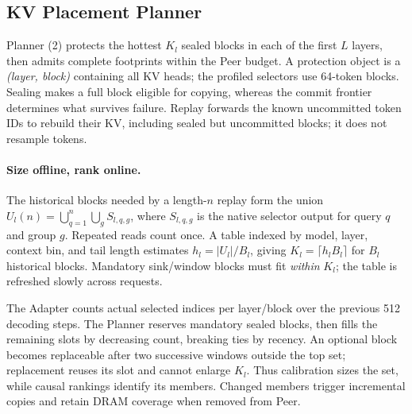 \subsection{KV Placement Planner}
\label{sec:kv-placement}
\label{sec:capacity-allocation}

Planner (2) protects the hottest $K_l$ sealed blocks in each of the
first $L$ layers, then admits complete footprints within the Peer budget.
A protection object is a \emph{(layer, block)} containing
all KV heads; the profiled selectors use 64-token blocks.
Sealing makes a full block eligible for copying, whereas the commit
frontier determines what survives failure. Replay forwards the known
uncommitted token IDs to rebuild their KV, including sealed but
uncommitted blocks; it does not resample tokens.

\paragraph{Size offline, rank online.}
The historical blocks needed by a length-$n$ replay form the union
$U_l(n)=\bigcup_{q=1}^{n}\bigcup_g S_{l,q,g}$, where $S_{l,q,g}$ is the
native selector output for query $q$ and group $g$. Repeated reads count
once. A table indexed by model, layer, context bin, and tail length
estimates $h_l=|U_l|/B_l$, giving $K_l=\lceil h_l B_l\rceil$ for $B_l$
historical blocks. Mandatory sink/window blocks must fit \emph{within}
$K_l$; the table is refreshed slowly across requests.

The Adapter counts actual selected indices per layer/block over the
previous 512 decoding steps. The Planner reserves mandatory sealed
blocks, then fills the remaining slots by decreasing count, breaking
ties by recency. An optional block becomes replaceable after two
successive windows outside the top set; replacement reuses its slot
and cannot enlarge $K_l$. Thus calibration sizes the set, while causal
rankings identify its members. Changed members trigger incremental
copies and retain DRAM coverage when removed from Peer.

